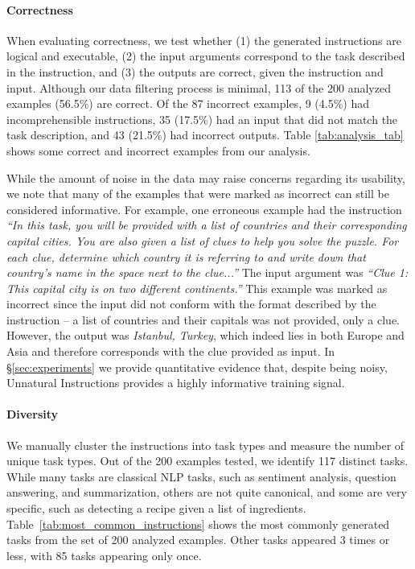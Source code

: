 \paragraph{Correctness}
When evaluating correctness, we test whether (1) the generated instructions are logical and executable, (2) the input arguments correspond to the task described in the instruction, and (3) the outputs are correct, given the instruction and input. Although our data filtering process is minimal, 113 of the 200 analyzed examples (56.5\%) are correct. Of the 87 incorrect examples, 9 (4.5\%) had incomprehensible instructions, 35 (17.5\%) had an input that did not match the task description, and 43 (21.5\%) had incorrect outputs. Table \ref{tab:analysis_tab} shows some correct and incorrect examples from our analysis.

While the amount of noise in the data may raise concerns regarding its usability, we note that many of the examples that were marked as incorrect can still be considered informative. For example, one erroneous example had the instruction \textit{``In this task, you will be provided with a list of countries and their corresponding capital cities. You are also given a list of clues to help you solve the puzzle. For each clue, determine which country it is referring to and write down that country's name in the space next to the clue...''} The input argument was \textit{``Clue 1: This capital city is on two different continents.''} This example was marked as incorrect since the input did not conform with the format described by the instruction -- a list of countries and their capitals was not provided, only a clue. However, the output was \textit{Istanbul, Turkey}, which indeed lies in both Europe and Asia and therefore corresponds with the clue provided as input. In \S\ref{sec:experiments} we provide quantitative evidence that, despite being noisy, Unnatural Instructions provides a highly informative training signal.

\paragraph{Diversity}
We manually cluster the instructions into task types and measure the number of unique task types. Out of the 200 examples tested, we identify 117 distinct tasks. While many tasks are classical NLP tasks, such as sentiment analysis, question answering, and summarization, others are not quite canonical, and some are very specific, such as detecting a recipe given a list of ingredients. Table~\ref{tab:most_common_instructions} shows the most commonly generated tasks from the set of 200 analyzed examples. Other tasks appeared 3 times or less, with 85 tasks appearing only once.

